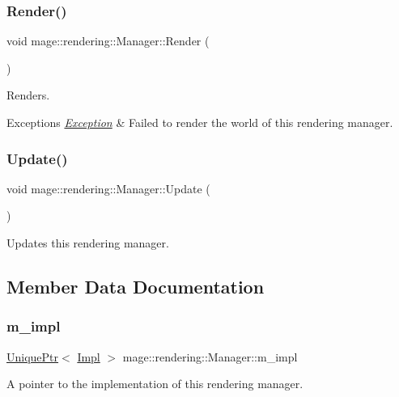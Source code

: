 \subsubsection{\texorpdfstring{Render()}{Render()}}
{\footnotesize\ttfamily void mage\+::rendering\+::\+Manager\+::\+Render (\begin{DoxyParamCaption}{ }\end{DoxyParamCaption})}

Renders.


\begin{DoxyExceptions}{Exceptions}
{\em \hyperlink{classmage_1_1_exception}{Exception}} & Failed to render the world of this rendering manager. \\
\hline
\end{DoxyExceptions}
\hypertarget{classmage_1_1rendering_1_1_manager_a878849c66920ccef910b31c80b1f033c}{}\label{classmage_1_1rendering_1_1_manager_a878849c66920ccef910b31c80b1f033c} 
\subsubsection{\texorpdfstring{Update()}{Update()}}
{\footnotesize\ttfamily void mage\+::rendering\+::\+Manager\+::\+Update (\begin{DoxyParamCaption}{ }\end{DoxyParamCaption})}

Updates this rendering manager. 

\subsection{Member Data Documentation}
\hypertarget{classmage_1_1rendering_1_1_manager_a1fa26fd6393941f4ef9b6863f317cd29}{}\label{classmage_1_1rendering_1_1_manager_a1fa26fd6393941f4ef9b6863f317cd29} 
\subsubsection{\texorpdfstring{m\+\_\+impl}{m\_impl}}
{\footnotesize\ttfamily \hyperlink{namespacemage_a3316d7143a973e37adf1110f2e80ca31}{Unique\+Ptr}$<$ \hyperlink{classmage_1_1rendering_1_1_manager_1_1_impl}{Impl} $>$ mage\+::rendering\+::\+Manager\+::m\+\_\+impl\hspace{0.3cm}{\ttfamily [private]}}

A pointer to the implementation of this rendering manager. 